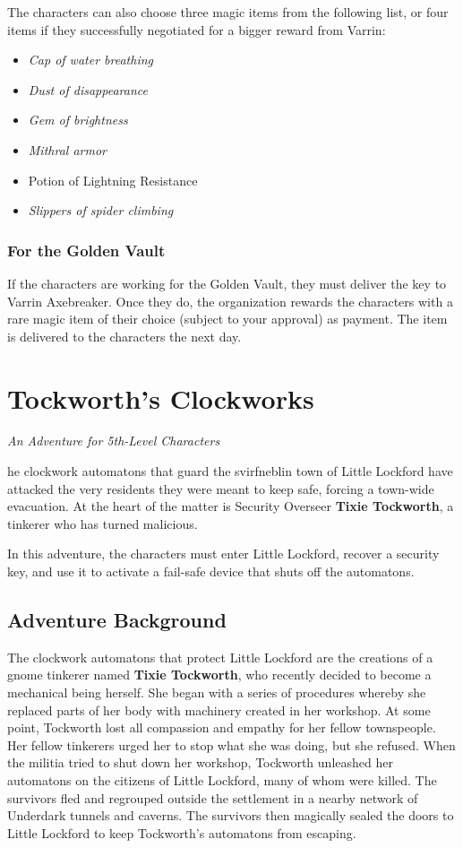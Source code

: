 \documentclass[10pt,a4paper,twoside,bg=print,twocolumn,openany,nodeprecatedcode]{dndbook}
\begin{document}
The characters can also choose three magic items from the following list, or four items if they successfully negotiated for a bigger reward from Varrin:


\begin{itemize}
\item \textit{Cap of water breathing}
\item \textit{Dust of disappearance}
\item \textit{Gem of brightness}
\item \textit{Mithral armor}
\item Potion of Lightning Resistance
\item \textit{Slippers of spider climbing}
\end{itemize}

\subsection{For the Golden Vault}
If the characters are working for the Golden Vault, they must deliver the key to Varrin Axebreaker. Once they do, the organization rewards the characters with a rare magic item of their choice (subject to your approval) as payment. The item is delivered to the characters the next day.

\chapter{Tockworth's Clockworks}
\textit{An Adventure for 5th-Level Characters}

he clockwork automatons that guard the svirfneblin town of Little Lockford have attacked the very residents they were meant to keep safe, forcing a town-wide evacuation. At the heart of the matter is Security Overseer \textbf{Tixie Tockworth}, a tinkerer who has turned malicious.


In this adventure, the characters must enter Little Lockford, recover a security key, and use it to activate a fail-safe device that shuts off the automatons.

\section{Adventure Background}
The clockwork automatons that protect Little Lockford are the creations of a gnome tinkerer named \textbf{Tixie Tockworth}, who recently decided to become a mechanical being herself. She began with a series of procedures whereby she replaced parts of her body with machinery created in her workshop. At some point, Tockworth lost all compassion and empathy for her fellow townspeople. Her fellow tinkerers urged her to stop what she was doing, but she refused. When the militia tried to shut down her workshop, Tockworth unleashed her automatons on the citizens of Little Lockford, many of whom were killed. The survivors fled and regrouped outside the settlement in a nearby network of Underdark tunnels and caverns. The survivors then magically sealed the doors to Little Lockford to keep Tockworth's automatons from escaping.
\end{document}
